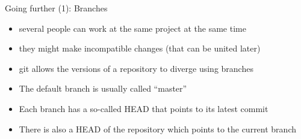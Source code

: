 \begin{frame}{Going further (1): Branches}
  \begin{itemize}
    \item several people can work at the same project at the same time
    \item they might make incompatible changes (that can be united later)
    \item git allows the versions of a repository to diverge using branches
    \item The default branch is usually called ``master''
    \item Each branch has a so-called HEAD that points to its latest commit
    \item There is also a HEAD of the repository which points to the current branch
  \end{itemize}
\end{frame}

